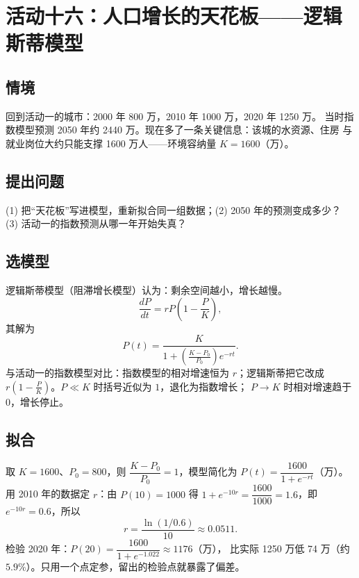 
\section{活动十六：人口增长的天花板——逻辑斯蒂模型}

\subsection{情境}
回到活动一的城市：2000 年 800 万，2010 年 1000 万，2020 年 1250 万。
当时指数模型预测 2050 年约 2440 万。现在多了一条关键信息：该城的水资源、住房
与就业岗位大约只能支撑 1600 万人——环境容纳量 $K=1600$（万）。

\subsection{提出问题}
(1) 把“天花板”写进模型，重新拟合同一组数据；(2) 2050 年的预测变成多少？
(3) 活动一的指数预测从哪一年开始失真？

\subsection{选模型}
逻辑斯蒂模型（阻滞增长模型）认为：剩余空间越小，增长越慢。
\[
  \frac{dP}{dt}=rP\left(1-\frac{P}{K}\right),
\]
其解为
\[
  P(t)=\frac{K}{1+\left(\frac{K-P_0}{P_0}\right)e^{-rt}}.
\]
与活动一的指数模型对比：指数模型的相对增速恒为 $r$；逻辑斯蒂把它改成
$r\left(1-\frac{P}{K}\right)$。$P\ll K$ 时括号近似为 $1$，退化为指数增长；
$P\to K$ 时相对增速趋于 $0$，增长停止。

\subsection{拟合}
取 $K=1600$、$P_0=800$，则 $\dfrac{K-P_0}{P_0}=1$，模型简化为
$P(t)=\dfrac{1600}{1+e^{-rt}}$（万）。
用 2010 年的数据定 $r$：由 $P(10)=1000$ 得
$1+e^{-10r}=\dfrac{1600}{1000}=1.6$，即 $e^{-10r}=0.6$，所以
\[
  r=\frac{\ln(1/0.6)}{10}\approx0.0511.
\]
检验 2020 年：$P(20)=\dfrac{1600}{1+e^{-1.022}}\approx1176$（万），
比实际 1250 万低 74 万（约 $5.9\%$）。只用一个点定参，留出的检验点就暴露了偏差。

